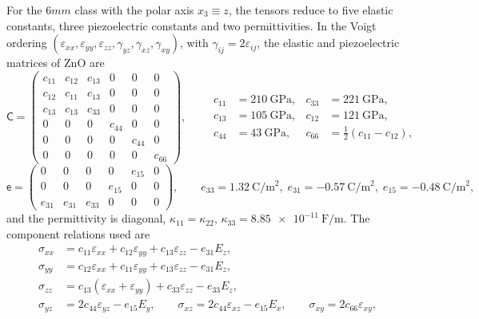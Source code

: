 For the $6mm$ class with the polar axis $x_3\equiv z$, the tensors reduce to five elastic constants, three piezoelectric constants and two permittivities.  In the Voigt ordering $(\varepsilon_{xx},\varepsilon_{yy},\varepsilon_{zz},\gamma_{yz},\gamma_{xz},\gamma_{xy})$, with $\gamma_{ij}=2\varepsilon_{ij}$, the elastic and piezoelectric matrices of ZnO are
\begin{equation}
\label{eq:CZnO}
\mathsf C=
\begin{pmatrix}
c_{11}&c_{12}&c_{13}&0&0&0\\
c_{12}&c_{11}&c_{13}&0&0&0\\
c_{13}&c_{13}&c_{33}&0&0&0\\
0&0&0&c_{44}&0&0\\
0&0&0&0&c_{44}&0\\
0&0&0&0&0&c_{66}
\end{pmatrix},
\qquad
\begin{aligned}
c_{11}&=\SI{210}{\giga\pascal},& c_{33}&=\SI{221}{\giga\pascal},\\
c_{13}&=\SI{105}{\giga\pascal},& c_{12}&=\SI{121}{\giga\pascal},\\
c_{44}&=\SI{43}{\giga\pascal},& c_{66}&=\tfrac12(c_{11}-c_{12}),
\end{aligned}
\end{equation}
{\small\begin{equation}
\label{eq:ZnOe}
\mathsf e=
\begin{pmatrix}
0&0&0&0&e_{15}&0\\
0&0&0&e_{15}&0&0\\
e_{31}&e_{31}&e_{33}&0&0&0
\end{pmatrix},
\qquad
e_{33}=\SI{1.32}{\coulomb\per\square\metre},\;
e_{31}=\SI{-0.57}{\coulomb\per\square\metre},\;
e_{15}=\SI{-0.48}{\coulomb\per\square\metre},
\end{equation}}
and the permittivity is diagonal, $\kappa_{11}=\kappa_{22}$, $\kappa_{33}=\SI{8.85e-11}{\farad\per\metre}$.  The component relations used are
\begin{equation}
\label{eq:sigmaZnO}
\begin{aligned}
\sigma_{xx}&=c_{11}\varepsilon_{xx}+c_{12}\varepsilon_{yy}
+c_{13}\varepsilon_{zz}-e_{31}E_z,\\
\sigma_{yy}&=c_{12}\varepsilon_{xx}+c_{11}\varepsilon_{yy}
+c_{13}\varepsilon_{zz}-e_{31}E_z,\\
\sigma_{zz}&=c_{13}(\varepsilon_{xx}+\varepsilon_{yy})
+c_{33}\varepsilon_{zz}-e_{33}E_z,\\
\sigma_{yz}&=2c_{44}\varepsilon_{yz}-e_{15}E_y,\qquad
\sigma_{xz}=2c_{44}\varepsilon_{xz}-e_{15}E_x,\qquad
\sigma_{xy}=2c_{66}\varepsilon_{xy},
\end{aligned}
\end{equation}

